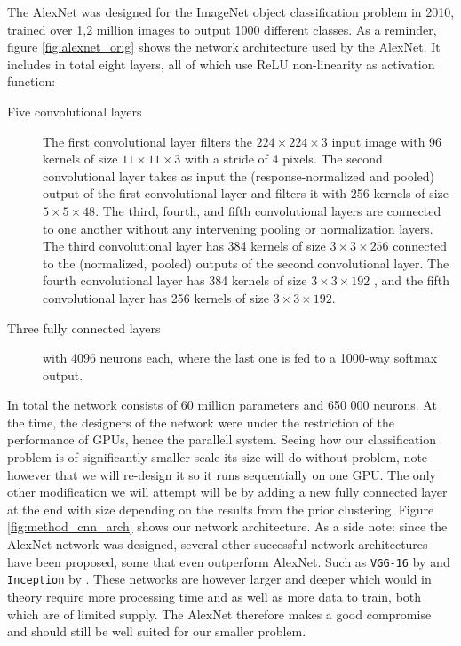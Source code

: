 The AlexNet was designed for the ImageNet object classification problem in 2010, trained over 1,2 million images to output 1000 different classes. As a reminder, figure \ref{fig:alexnet_orig} shows the network architecture used by the AlexNet. It includes in total eight layers, all of which use ReLU non-linearity as activation function:

\begin{description}

	\item[Five convolutional layers] The first convolutional layer filters the \(224 \times 224 \times 3\) input image with 96 kernels of size \(11 \times 11 \times 3\) with a stride of 4 pixels. The second convolutional layer takes as input the (response-normalized and pooled) output of the first convolutional layer and filters it with 256 kernels of size \(5 \times 5 \times 48\). The third, fourth, and fifth convolutional layers are connected to one another without any intervening pooling or normalization layers. The third convolutional layer has 384 kernels of size \(3 \times 3 \times 256\) connected to the (normalized, pooled) outputs of the second convolutional layer. The fourth convolutional layer has 384 kernels of size \(3 \times 3 \times 192\) , and the fifth convolutional layer has 256 kernels of size \(3 \times 3 \times 192\).

	\item[Three fully connected layers] with 4096 neurons each, where the last one is fed to a 1000-way softmax output.

\end{description}

In total the network consists of 60 million parameters and 650 000 neurons. At the time, the designers of the network were under the restriction of the performance of GPUs, hence the parallell system. Seeing how our classification problem is of significantly smaller scale its size will do without problem, note however that we will re-design it so it runs sequentially on one GPU. The only other modification we will attempt will be by adding a new fully connected layer at the end with size depending on the results from the prior clustering. Figure \ref{fig:method_cnn_arch} shows our network architecture. As a side note: since the AlexNet network was designed, several other successful network architectures have been proposed, some that even outperform AlexNet. Such as \texttt{VGG-16} by \textcite{Arge2015} and \texttt{Inception} by \textcite{Szegedy2014}. These networks are however larger and deeper which would in theory require more processing time and as well as more data to train, both which are of limited supply. The AlexNet therefore makes a good compromise and should still be well suited for our smaller problem.

